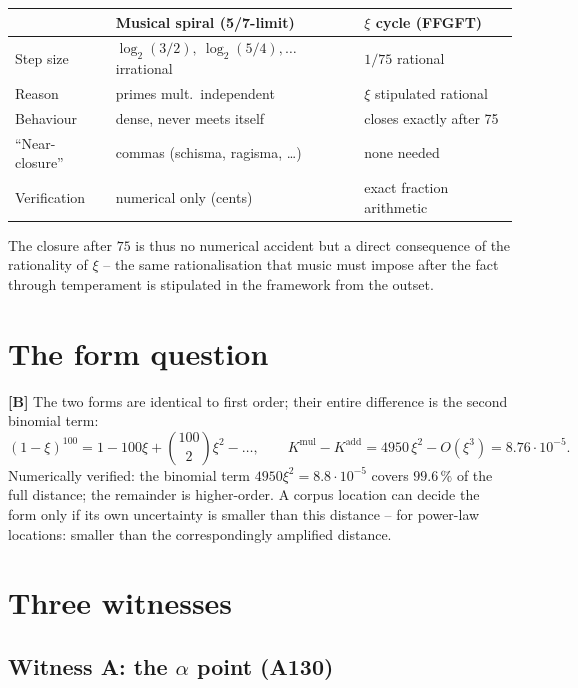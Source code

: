 \begin{center}
\begin{tabular}{lll}
\toprule
 & Musical spiral (5/7-limit) & $\xi$ cycle (FFGFT) \\
\midrule
Step size & $\log_2(3/2),\ \log_2(5/4),\ldots$ irrational & $1/75$ rational \\
Reason & primes mult.\ independent & $\xi$ stipulated rational \\
Behaviour & dense, never meets itself & closes exactly after 75 \\
\enquote{Near-closure} & commas (schisma, ragisma, \ldots) & none needed \\
Verification & numerical only (cents) & exact fraction arithmetic \\
\bottomrule
\end{tabular}
\end{center}

The closure after $75$ is thus no numerical accident but a direct
consequence of the rationality of $\xi$ -- the same rationalisation
that music must impose after the fact through temperament is
stipulated in the framework from the outset.

\section{The form question}
\label{sec:formfrage}

\textbf{[B]} The two forms are identical to first order; their entire
difference is the second binomial term:
\[
  (1-\xi)^{100} = 1 - 100\xi + \binom{100}{2}\xi^2 - \ldots,
  \qquad
  K^{\text{mul}} - K^{\text{add}} = 4950\,\xi^2 - O(\xi^3)
  = 8.76\cdot10^{-5}.
\]
Numerically verified: the binomial term $4950\xi^2 = 8.8\cdot10^{-5}$
covers $99.6\,\%$ of the full distance; the remainder is higher-order.
A corpus location can decide the form only if its own uncertainty is
smaller than this distance -- for power-law locations: smaller than
the correspondingly amplified distance.

\section{Three witnesses}
\label{sec:zeugen}

\subsection{Witness A: the $\alpha$ point (A130)}

